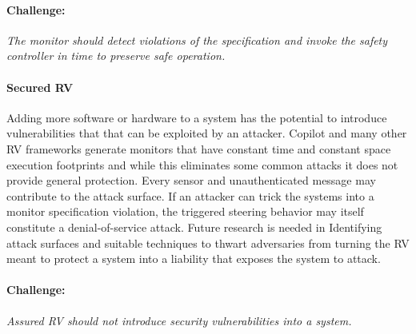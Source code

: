 \paragraph{Challenge:} \emph{The monitor should detect  violations of the specification and invoke the safety controller in time to preserve safe operation.}




\paragraph{Secured RV} Adding more software or hardware to a system
has the potential to introduce vulnerabilities that that can be
exploited by an attacker.  Copilot and many other RV frameworks
generate monitors that have constant time and constant space execution
footprints and while this eliminates some common attacks it does not
provide general protection. Every sensor and unauthenticated message
may contribute to the attack surface. If an attacker can trick the
systems into a monitor specification violation, the triggered steering
behavior may itself constitute a denial-of-service attack.  Future
research is needed in Identifying attack surfaces and suitable
techniques to thwart adversaries from turning the RV meant to protect
a system into a liability that exposes the system to attack.

\paragraph{Challenge:} \emph{Assured RV should not introduce security
vulnerabilities into a system.} 



